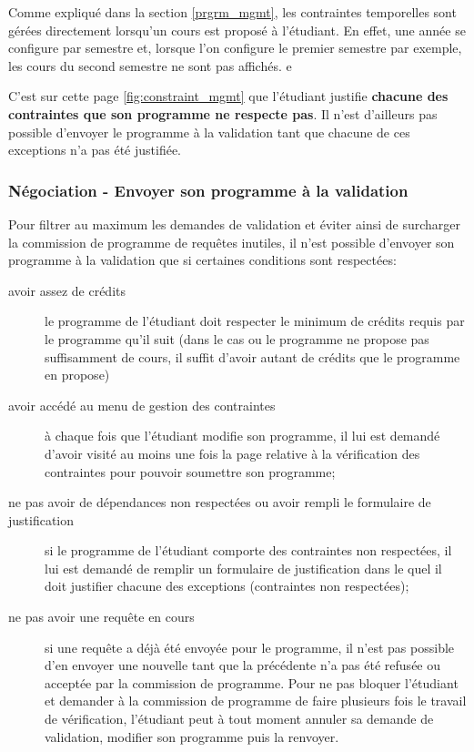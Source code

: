 Comme expliqué dans la section \ref{prgrm_mgmt}, les contraintes temporelles sont gérées directement lorsqu'un cours est proposé à l'étudiant. En effet, une année se configure par semestre et, lorsque l'on configure le premier semestre par exemple, les cours du second semestre ne sont pas affichés. e 

C'est sur cette page \ref{fig:constraint_mgmt} que l'étudiant justifie \textbf{chacune des contraintes que son programme ne respecte pas}. Il n'est d'ailleurs pas possible d'envoyer le programme à la validation tant que chacune de ces exceptions n'a pas été justifiée.

\subsubsection{Négociation - Envoyer son programme à la validation}
 \label{validation_request}
Pour filtrer au maximum les demandes de validation et éviter ainsi de surcharger la commission de programme de requêtes inutiles, il n'est possible d'envoyer son programme à la validation que si certaines conditions sont respectées:
\begin{description}
  \item[avoir assez de crédits] le programme de l'étudiant doit respecter le minimum de crédits requis par le programme qu'il suit (dans le cas ou le programme ne propose pas suffisamment de cours, il suffit d'avoir autant de crédits que le programme en propose)
  \item[avoir accédé au menu de gestion des contraintes] à chaque fois que l'étudiant modifie son programme, il lui est demandé d'avoir visité au moins une fois la page relative à la vérification des contraintes pour pouvoir soumettre son programme;
  \item[ne pas avoir de dépendances non respectées ou avoir rempli le formulaire de justification] si le programme de l'étudiant comporte des contraintes non respectées, il lui est demandé de remplir un formulaire de justification dans le quel il doit justifier chacune des exceptions (contraintes non respectées);
  \item[ne pas avoir une requête en cours] si une requête a déjà été envoyée pour le programme, il n'est pas possible d'en envoyer une nouvelle tant que la précédente n'a pas été refusée ou acceptée par la commission de programme. Pour ne pas bloquer l'étudiant et demander à la commission de programme de faire plusieurs fois le travail de vérification, l'étudiant peut à tout moment annuler sa demande de validation, modifier son programme puis la renvoyer. 
\end{description} 

